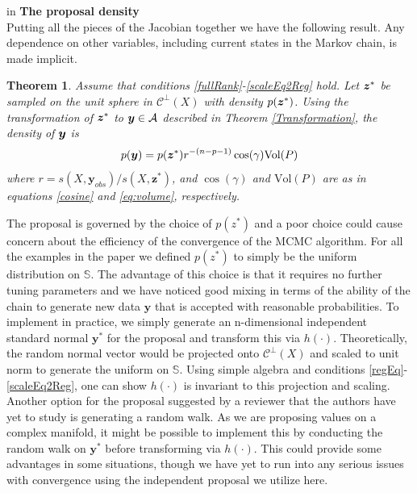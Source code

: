 \documentclass[ba]{imsart}
\newcommand{\by}{\mbox{\boldmath $y$}}
\newcommand{\bz}{\mbox{\boldmath $z$}}
\newcommand{\mb}{\mathbf}
\newcommand{\mc}{\mathcal}
\newtheorem{theorem}{Theorem}[section]
\newcommand{\response}[1]{{\color{blue}#1}}
\begin{document}
 in
\noindent
{\bf The proposal density} \\
Putting all the pieces of the Jacobian together we have the following result. Any dependence on other variables, including current states in the Markov chain, is made implicit. 
\begin{theorem} 
Assume that conditions \ref{fullRank}-\ref{scaleEq2Reg} hold.  Let $\bz^{*}$ be sampled on the unit sphere in $\mc {C}^\perp (X)$ with density $p(\bz^{*})$.  Using the transformation of $\bz^*$ to $\by\in \mc A$ described in Theorem \ref{Transformation}, the density of $\by$ is
\begin{equation}
\label{dens:ystst}
p(\by)=p(\bz^*) r^{-(n-p-1)} \cos(\gamma)\text{Vol} (P)
\end{equation}
where $r={s(X,\boldsymbol{y}_{obs})}/{s(X,  \boldsymbol{z}^{*})}$,
and $\cos(\gamma)$ and $\text{Vol} (P)$ are as in equations \eqref{cosine} and \eqref{eq:volume}, respectively. 
\end{theorem} 
\response{The proposal is governed by the choice of $p(z^{*})$ and a poor choice could cause concern about the efficiency of the convergence of the MCMC algorithm. For all the examples in the paper we defined $p(z^{*})$ to simply be the uniform distribution on $\mathbb{S}$. The advantage of this choice is that it requires no further tuning parameters and we have noticed good mixing in terms of the ability of the chain to generate new data $\mb y$ that is accepted with reasonable probabilities. To implement in practice, we simply generate an n-dimensional independent standard normal $\mb y^{*}$ for the proposal and transform this via $h(\cdot)$. Theoretically, the random normal vector would be projected onto $\mc{C}^{\perp}(X)$ and scaled to unit norm to generate the uniform on $\mathbb{S}$. Using simple algebra and conditions \ref{regEq}-\ref{scaleEq2Reg}, one can show $h(\cdot)$ is invariant to this projection and scaling. Another option for the proposal suggested by a reviewer that the authors have yet to study is generating a random walk. As we are proposing values on a complex manifold, it might be possible to implement this by conducting the random walk on $\mb y^{*}$ before transforming via $h(\cdot)$. This could provide some advantages in some situations, though we have yet to run into any serious issues with convergence using the independent proposal we utilize here.}
\end{document}
